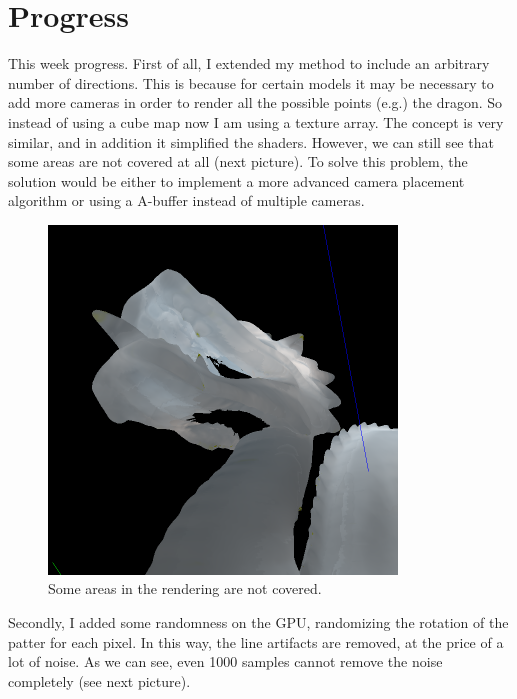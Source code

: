 \documentclass[12pt, twoside,a4paper]{article}
\begin{document}
\section{Progress}

This week progress. First of all, I extended my method to include an arbitrary number of directions. This is because for certain models it may be necessary to add more cameras in order to render all the possible points (e.g.) the dragon. So instead of using a cube map now I am using a texture array. The concept is very similar, and in addition it simplified the shaders. However, we can still see that some areas are not covered at all (next picture). To solve this problem, the solution would be either to implement a more advanced camera placement algorithm or using a A-buffer instead of multiple cameras.

\vspace{0.5cm}
\begin{figure}[!h]
\centering
\includegraphics[width=350px]{missing.png}
\caption{Some areas in the rendering are not covered.}
\label{fig:img}
\end{figure}

\clearpage
Secondly, I added some randomness on the GPU, randomizing the rotation of the patter for each pixel. In this way, the line artifacts are removed, at the price of a lot of noise. As we can see, even 1000 samples cannot remove the noise completely (see next picture).
\end{document}
